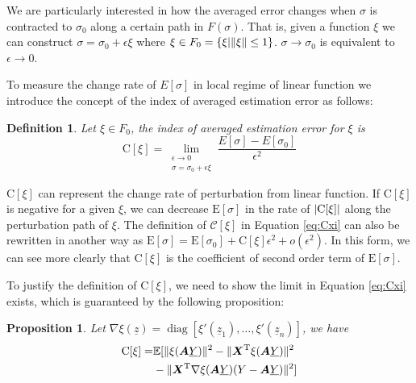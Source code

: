 \documentclass[conference]{IEEEtran}
\newtheorem{definition}{Definition}
\newtheorem{proposition}{Proposition}
\DeclarePairedDelimiter\abs{\lvert}{\rvert}
\DeclarePairedDelimiter\norm{\lVert}{\rVert}
\def\E{\mathbb{E}}
\def\T{\mathrm{T}}
\DeclareMathOperator*{\diag}{diag}
\begin{document}
We are particularly interested in how the averaged error changes when $\sigma$ is contracted to $\sigma_0$ along a certain path in $F(\sigma)$. That is, given a function $\xi$ we can construct $\sigma = \sigma_0 + \epsilon \xi$ where $\xi \in F_0 = \{\xi | \norm{\xi} \leq 1 \}$. $\sigma \to \sigma_0$ is equivalent to $\epsilon \to 0$.

To measure the change rate of $E[\sigma]$ in local regime of linear function we introduce the concept of the index of averaged estimation error as follows:
\begin{definition}
Let $\xi \in F_0$, the index of averaged estimation error for $\xi$ is
\begin{equation}\label{eq:Cxi}
\mathrm{C}[\xi] = \lim_{\substack{\epsilon \to 0 \\ \sigma = \sigma_0 + \epsilon \xi}} \frac{E[\sigma] - E[\sigma_0]}{\epsilon^2}
\end{equation}
\end{definition}

$\mathrm{C}[\xi]$ can represent the change rate of perturbation from linear function. If $\mathrm{C}[\xi]$ is negative for a given $\xi$, we can decrease $\mathrm{E}[\sigma]$ in the rate of $\abs{\mathrm{C}[\xi]}$ along  the perturbation path of $\xi$.
The definition of $\mathcal{C}[\xi]$ in Equation \eqref{eq:Cxi} can also be rewritten in another way as
$\mathrm{E}[\sigma] = \mathrm{E}[\sigma_0] +
\mathrm{C}[\xi]\epsilon^2 + o(\epsilon^2)$. In this form, we can see more clearly that $\mathrm{C}[\xi]$ is the coefficient of second order term of $\mathrm{E}[\sigma]$.

To justify the definition of $\mathrm{C}[\xi]$, we need to show the limit in Equation \eqref{eq:Cxi} exists, which is guaranteed by the following proposition:

\begin{proposition}\label{prop:Esigma} 
Let $\nabla \xi(\underline{z})  = \diag[\xi'(\underline{z}_1), \dots, \xi'(\underline{z}_n)]$, we have
\begin{align}\notag
\mathrm{C}[\xi]= & \E[\norm{\xi(\bm{A}\underline{Y})}^2 -
\norm{\bm{X}^\T\xi(\bm{A}\underline{Y})}^2 \\
&- \norm{\bm{X}^\T \nabla\xi(\bm{A}\underline{Y})(Y-\bm{A}\underline{Y})}^2]
\end{align}
\end{proposition}
\end{document}
